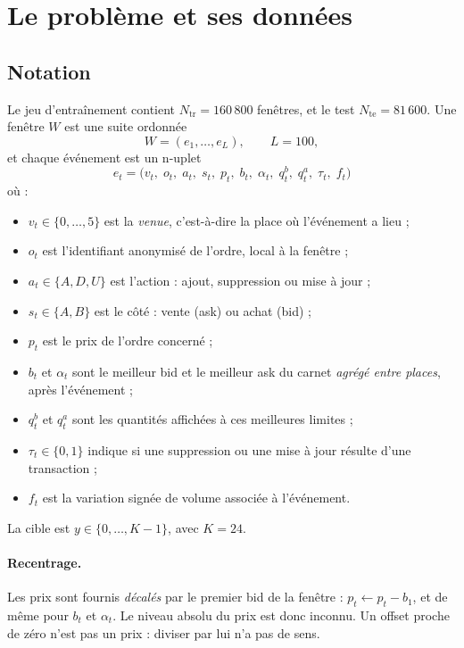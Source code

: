 \section{Le problème et ses données}\label{sec:probleme}

\subsection{Notation}
Le jeu d'entraînement contient $N_{\text{tr}}=160\,800$ fenêtres, et le test $N_{\text{te}}=81\,600$. Une fenêtre $W$ est une suite ordonnée
\begin{equation}
W=(e_1,\dots,e_L),\qquad L=100,
\end{equation}
et chaque événement est un n-uplet
\begin{equation}
e_t=\big(v_t,\;o_t,\;a_t,\;s_t,\;p_t,\;b_t,\;\alpha_t,\;q^b_t,\;q^a_t,\;\tau_t,\;f_t\big)
\end{equation}
où :
\begin{itemize}
\item $v_t\in\{0,\dots,5\}$ est la \emph{venue}, c'est-à-dire la place où l'événement a lieu ;
\item $o_t$ est l'identifiant anonymisé de l'ordre, local à la fenêtre ;
\item $a_t\in\{A,D,U\}$ est l'action : ajout, suppression ou mise à jour ;
\item $s_t\in\{A,B\}$ est le côté : vente (ask) ou achat (bid) ;
\item $p_t$ est le prix de l'ordre concerné ;
\item $b_t$ et $\alpha_t$ sont le meilleur bid et le meilleur ask du carnet \emph{agrégé entre places}, après l'événement ;
\item $q^b_t$ et $q^a_t$ sont les quantités affichées à ces meilleures limites ;
\item $\tau_t\in\{0,1\}$ indique si une suppression ou une mise à jour résulte d'une transaction ;
\item $f_t$ est la variation signée de volume associée à l'événement.
\end{itemize}
La cible est $y\in\{0,\dots,K-1\}$, avec $K=24$.

\paragraph{Recentrage.} Les prix sont fournis \emph{décalés} par le premier bid de la fenêtre : $p_t\leftarrow p_t-b_1$, et de même pour $b_t$ et $\alpha_t$. Le niveau absolu du prix est donc inconnu. Un offset proche de zéro n'est pas un prix : diviser par lui n'a pas de sens.


